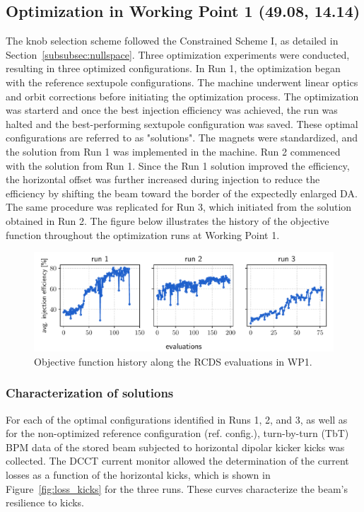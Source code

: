 \subsection{Optimization in Working Point 1 (49.08, 14.14)}
The knob selection scheme followed the Constrained Scheme I, as detailed in Section~\ref{subsubsec:nullspace}. Three optimization experiments were conducted, resulting in three optimized configurations. In Run 1, the optimization began with the reference sextupole configurations. The machine underwent linear optics and orbit corrections before initiating the optimization process. The optimization was starterd and once the best injection efficiency was achieved, the run was halted and the best-performing sextupole configuration was saved. These optimal configurations are referred to as "solutions". The magnets were standardized, and the solution from Run 1 was implemented in the machine. Run 2 commenced with the solution from Run 1. Since the Run 1 solution improved the efficiency, the horizontal offset was further increased during injection to reduce the efficiency by shifting the beam toward the border of the expectedly enlarged DA. The same procedure was replicated for Run 3, which initiated from the solution obtained in Run 2. The figure below illustrates the history of the objective function throughout the optimization runs at Working Point 1.
\begin{figure}[tb]
    \centering
    \includegraphics[width=\columnwidth]{Images/wp1_objfunc_hist.pdf}
    \caption[Objective function history along the RCDS evaluations in WP1.]{Objective function history along the RCDS evaluations in WP1.}
\end{figure}
\subsubsection{Characterization of solutions}
For each of the optimal configurations identified in Runs 1, 2, and 3, as well as for the non-optimized reference configuration (ref. config.), turn-by-turn (TbT) BPM data of the stored beam subjected to horizontal dipolar kicker kicks was collected. The DCCT current monitor allowed the determination of the current losses as a function of the horizontal kicks, which is shown in Figure~\ref{fig:loss_kicks} for the three runs. These curves characterize the beam's resilience to kicks.

